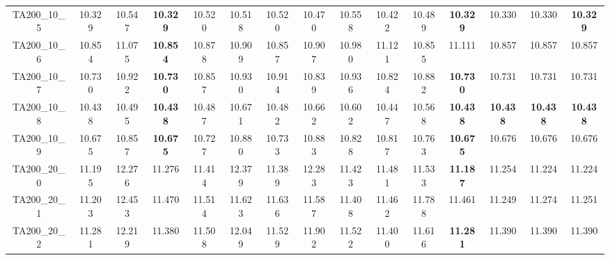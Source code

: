 \begin{tabular}{cc||ccccccccccccc}
TA200\_10\_5       & 10.329           & 10.547           & {\bf 10.329}     & 10.520           & 10.518           & 10.520           & 10.470           & 10.558           & 10.422           & 10.489           & {\bf 10.329}     & 10.330           & 10.330           & {\bf 10.329}    \\ 
TA200\_10\_6       & 10.854           & 11.075           & {\bf 10.854}     & 10.878           & 10.909           & 10.857           & 10.907           & 10.980           & 11.121           & 10.855           & 11.111           & 10.857           & 10.857           & 10.857          \\ 
TA200\_10\_7       & 10.730           & 10.922           & {\bf 10.730}     & 10.857           & 10.930           & 10.914           & 10.839           & 10.936           & 10.824           & 10.882           & {\bf 10.730}     & 10.731           & 10.731           & 10.731          \\ 
TA200\_10\_8       & 10.438           & 10.495           & {\bf 10.438}     & 10.487           & 10.671           & 10.482           & 10.662           & 10.602           & 10.447           & 10.568           & {\bf 10.438}     & {\bf 10.438}     & {\bf 10.438}     & {\bf 10.438}    \\ 
TA200\_10\_9       & 10.675           & 10.857           & {\bf 10.675}     & 10.727           & 10.880           & 10.733           & 10.883           & 10.828           & 10.817           & 10.763           & {\bf 10.675}     & 10.676           & 10.676           & 10.676          \\ 
TA200\_20\_0       & 11.195           & 12.276           & 11.276           & 11.414           & 12.379           & 11.389           & 12.283           & 11.423           & 11.481           & 11.533           & {\bf 11.187}     & 11.254           & 11.224           & 11.224          \\ 
TA200\_20\_1       & 11.203           & 12.453           & 11.470           & 11.514           & 11.623           & 11.636           & 11.587           & 11.408           & 11.462           & 11.788           & 11.461           & 11.249           & 11.274           & 11.251          \\ 
TA200\_20\_2       & 11.281           & 12.219           & 11.380           & 11.508           & 12.049           & 11.529           & 11.902           & 11.522           & 11.400           & 11.616           & {\bf 11.281}     & 11.390           & 11.390           & 11.390          \\ 

\end{tabular}
